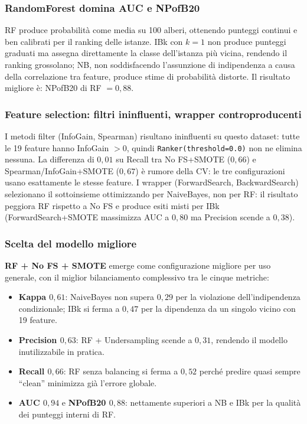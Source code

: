 \subsubsection{RandomForest domina AUC e NPofB20}

RF produce probabilità come media su 100 alberi, ottenendo punteggi continui
e ben calibrati per il ranking delle istanze. IBk con $k=1$ non produce
punteggi graduati ma assegna direttamente la classe dell'istanza più vicina,
rendendo il ranking grossolano; NB, non soddisfacendo l'assunzione di
indipendenza a causa della correlazione tra feature, produce stime di
probabilità distorte. Il risultato migliore è: NPofB20 di RF $= 0{,}88$.

\subsubsection{Feature selection: filtri ininfluenti, wrapper controproducenti}

I metodi filter (InfoGain, Spearman) risultano ininfluenti su questo dataset: tutte le 19
feature hanno InfoGain $> 0$, quindi \texttt{Ranker(threshold=0.0)} non ne elimina nessuna.
La differenza di $0{,}01$ su Recall tra No FS+SMOTE ($0{,}66$) e Spearman/InfoGain+SMOTE
($0{,}67$) è rumore della CV: le tre configurazioni usano esattamente le stesse feature.
I wrapper (ForwardSearch, BackwardSearch) selezionano il sottoinsieme ottimizzando per
NaiveBayes, non per RF: il risultato peggiora RF rispetto a No FS e produce esiti misti
per IBk (ForwardSearch+SMOTE massimizza AUC a $0{,}80$ ma Precision scende a $0{,}38$).

\subsubsection{Scelta del modello migliore}

\textbf{RF + No FS + SMOTE} emerge come configurazione migliore per uso generale, con il
miglior bilanciamento complessivo tra le cinque metriche:

\begin{itemize}[noitemsep]
  \item \textbf{Kappa $0{,}61$}: NaiveBayes non supera $0{,}29$ per la violazione
        dell'indipendenza condizionale; IBk si ferma a $0{,}47$ per la dipendenza da un
        singolo vicino con 19 feature.
  \item \textbf{Precision $0{,}63$}: RF + Undersampling scende a $0{,}31$, rendendo
        il modello inutilizzabile in pratica.
  \item \textbf{Recall $0{,}66$}: RF senza balancing si ferma a $0{,}52$ perché predire
        quasi sempre ``clean'' minimizza già l'errore globale.
  \item \textbf{AUC $0{,}94$} e \textbf{NPofB20 $0{,}88$}: nettamente superiori a NB
        e IBk per la qualità dei punteggi interni di RF.
\end{itemize}

